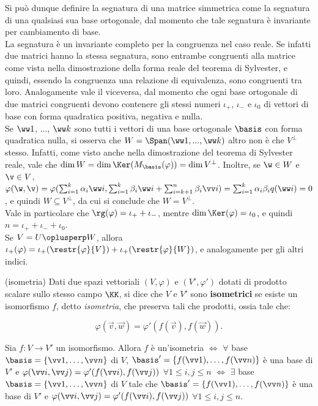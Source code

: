 \begin{remark} \nl
	\li Si può dunque definire la segnatura di una matrice simmetrica
	come la segnatura di una qualsiasi sua base ortogonale, dal
	momento che tale segnatura è invariante per cambiamento di base. \\
	\li La segnatura è un invariante completo per la congruenza nel caso reale. Se infatti due matrici hanno la stessa segnatura, sono
	entrambe congruenti alla matrice come vista nella dimostrazione
	della forma reale del teorema di Sylvester, e quindi, essendo
	la congruenza una relazione di equivalenza, sono congruenti
	tra loro. Analogamente vale il viceversa, dal momento che ogni
	base ortogonale di due matrici congruenti devono contenere gli
	stessi numeri $\iota_+$, $\iota_-$ e $\iota_0$ di vettori
	di base con forma quadratica positiva, negativa e nulla. \\
	\li Se $\ww 1$, ..., $\ww k$ sono tutti i vettori di una base
	ortogonale $\basis$ con forma quadratica nulla, si osserva che $W = \Span(\ww 1, ..., \ww k)$ altro non è che $V^\perp$ stesso. Infatti, come
	visto anche nella dimostrazione del teorema di Sylvester reale, vale
	che	$\dim W = \dim \Ker (M_\basis(\varphi)) = \dim V^\perp$. Inoltre,
	se $\w \in W$ e $\v \in V$, $\varphi(\w, \v) = \varphi(\sum_{i=1}^k
	\alpha_i \ww i, \sum_{i=1}^k \beta_i \ww i + \sum_{i=k+1}^n \beta_i \vv i)
	= \sum_{i=1}^k \alpha_i \beta_i q(\ww i) = 0$, e quindi
	$W \subseteq V^\perp$, da cui si conclude che $W = V^\perp$. \\
	\li Vale in particolare che $\rg(\varphi) = \iota_+ + \iota_-$, mentre
	$\dim \Ker(\varphi) = \iota_0$, e quindi $n = \iota_+ + \iota_- + \iota_0$. \\
	\li Se $V = U \oplusperp W$, allora $\iota_+(\varphi) = \iota_+(\restr{\varphi}{V}) + \iota_+(\restr{\varphi}{W})$, e
	analogamente per gli altri indici.
\end{remark}

\begin{definition} (isometria)
	Dati due spazi vettoriali $(V, \varphi)$ e
	$(V', \varphi')$ dotati di prodotto scalare sullo stesso campo $\KK$, si dice che
	$V$ e $V'$ sono \textbf{isometrici} se esiste un isomorfismo
	$f$, detto \textit{isometria}, che preserva tali che prodotti, ossia tale che:
	
	\[ \varphi(\vec v, \vec w) = \varphi'(f(\vec v), f(\vec w)). \]
\end{definition}

\begin{exercise} Sia $f : V \to V'$ un isomorfismo. Allora $f$ è un'isometria $\iff$ $\forall$ base $\basis = \{ \vv 1, \ldots, \vv n \}$ di $V$, $\basis' = \{ f(\vv 1), \ldots, f(\vv n) \}$ è una base di $V'$ e $\varphi(\vv i, \vv j) = \varphi'(f(\vv i), f(\vv j))$ $\forall 1 \leq i, j \leq n$ $\iff$ $\exists$ base $\basis = \{ \vv 1, \ldots, \vv n \}$ di $V$ tale che $\basis' = \{ f(\vv 1), \ldots, f(\vv n) \}$ è una base di $V'$ e $\varphi(\vv i, \vv j) = \varphi'(f(\vv i), f(\vv j))$ $\forall 1 \leq i, j \leq n$.
\end{exercise}

